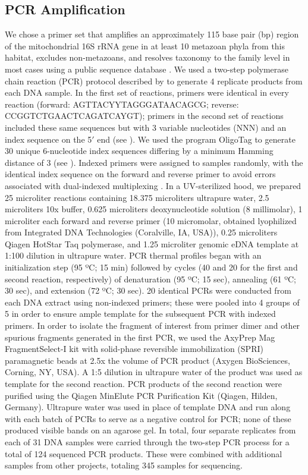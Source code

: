 \documentclass[11pt,letterpaper]{article} %
\begin{document}
\subsection*{PCR Amplification}
We chose a primer set that amplifies an approximately 115 base pair (bp) region of the mitochondrial 16S rRNA gene in at least 10 metazoan phyla from this habitat, excludes non-metazoans, and resolves taxonomy to the family level in most cases using a public sequence database \citep{Kelly2016FMS}.
We used a two-step polymerase chain reaction (PCR) protocol described by \citet{ODonnell2016} to generate 4 replicate products from each DNA sample.
In the first set of reactions, primers were identical in every reaction (forward: AGTTACYYTAGGGATAACAGCG; reverse: CCGGTCTGAACTCAGATCAYGT); primers in the second set of reactions included these same sequences but with 3 variable nucleotides (NNN) and an index sequence on the 5$'$ end (see ). We used the program OligoTag \citep{Coissac2012} to generate 30 unique 6-nucleotide index sequences differing by a minimum Hamming distance of 3 (see ). Indexed primers were assigned to samples randomly, with the identical index sequence on the forward and reverse primer to avoid errors associated with dual-indexed multiplexing \citep{Schnell2015}. In a UV-sterilized hood, we prepared 25 microliter reactions containing 18.375 microliters ultrapure water, 2.5 microliters 10x buffer, 0.625 microliters deoxynucleotide solution (8 millimolar), 1 microliter each forward and reverse primer (10 micromolar, obtained lyophilized from Integrated DNA Technologies (Coralville, IA, USA)), 0.25 microliters Qiagen HotStar Taq polymerase, and 1.25 microliter genomic eDNA template at 1:100 dilution in ultrapure water. PCR thermal profiles began with an initialization step (95 ºC; 15 min) followed by cycles (40 and 20 for the first and second reaction, respectively) of denaturation (95 ºC; 15 sec), annealing (61 ºC; 30 sec), and extension (72 ºC; 30 sec). 20 identical PCRs were conducted from each DNA extract using non-indexed primers; these were pooled into 4 groups of 5 in order to ensure ample template for the subsequent PCR with indexed primers. In order to isolate the fragment of interest from primer dimer and other spurious fragments generated in the first PCR, we used the AxyPrep Mag FragmentSelect-I kit with solid-phase reversible immobilization (SPRI) paramagnetic beads at 2.5x the volume of PCR product (Axygen BioSciences, Corning, NY, USA). A 1:5 dilution in ultrapure water of the product was used as template for the second reaction. PCR products of the second reaction were purified using the Qiagen MinElute PCR Purification Kit (Qiagen, Hilden, Germany). Ultrapure water was used in place of template DNA and run along with each batch of PCRs to serve as a negative control for PCR; none of these produced visible bands on an agarose gel. In total, four separate replicates from each of 31 DNA samples were carried through the two-step PCR process for a total of 124 sequenced PCR products. These were combined with additional samples from other projects, totaling 345 samples for sequencing.
\end{document}
